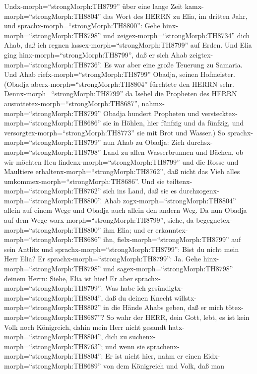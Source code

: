  Undx-morph=``strongMorph:TH8799'' über eine lange Zeit
kamx-morph=``strongMorph:TH8804'' das Wort des HERRN zu Elia, im dritten
Jahr, und sprachx-morph=``strongMorph:TH8800'': Gehe
hinx-morph=``strongMorph:TH8798'' und
zeigex-morph=``strongMorph:TH8734'' dich Ahab, daß ich regnen
lassex-morph=``strongMorph:TH8799'' auf Erden.  Und Elia
ging hinx-morph=``strongMorph:TH8799'', daß er sich Ahab
zeigtex-morph=``strongMorph:TH8736''. Es war aber eine große Teuerung zu
Samaria.  Und Ahab riefx-morph=``strongMorph:TH8799''
Obadja, seinen Hofmeister. (Obadja aberx-morph=``strongMorph:TH8804''
fürchtete den HERRN sehr. 
Dennx-morph=``strongMorph:TH8799'' da Isebel die Propheten des HERRN
ausrottetex-morph=``strongMorph:TH8687'',
nahmx-morph=``strongMorph:TH8799'' Obadja hundert Propheten und
verstecktex-morph=``strongMorph:TH8686'' sie in Höhlen, hier fünfzig und
da fünfzig, und versorgtex-morph=``strongMorph:TH8773'' sie mit Brot und
Wasser.)  So sprachx-morph=``strongMorph:TH8799'' nun Ahab
zu Obadja: Zieh durchsx-morph=``strongMorph:TH8798'' Land zu allen
Wasserbrunnen und Bächen, ob wir möchten Heu
findenx-morph=``strongMorph:TH8799'' und die Rosse und Maultiere
erhaltenx-morph=``strongMorph:TH8762'', daß nicht das Vieh alles
umkommex-morph=``strongMorph:TH8686''.  Und sie
teiltenx-morph=``strongMorph:TH8762'' sich ins Land, daß sie es
durchzogenx-morph=``strongMorph:TH8800''. Ahab
zogx-morph=``strongMorph:TH8804'' allein auf einem Wege und Obadja auch
allein den andern Weg.  Da nun Obadja auf dem Wege
warx-morph=``strongMorph:TH8799'', siehe, da
begegnetex-morph=``strongMorph:TH8800'' ihm Elia; und er
erkanntex-morph=``strongMorph:TH8686'' ihn,
fielx-morph=``strongMorph:TH8799'' auf sein Antlitz und
sprachx-morph=``strongMorph:TH8799'': Bist du nicht mein Herr Elia?
 Er sprachx-morph=``strongMorph:TH8799'': Ja. Gehe
hinx-morph=``strongMorph:TH8798'' und sagex-morph=``strongMorph:TH8798''
deinem Herrn: Siehe, Elia ist hier!  Er aber
sprachx-morph=``strongMorph:TH8799'': Was habe ich
gesündigtx-morph=``strongMorph:TH8804'', daß du deinen Knecht
willstx-morph=``strongMorph:TH8802'' in die Hände Ahabs geben, daß er
mich tötex-morph=``strongMorph:TH8687''?  So wahr der HERR,
dein Gott, lebt, es ist kein Volk noch Königreich, dahin mein Herr nicht
gesandt hatx-morph=``strongMorph:TH8804'', dich zu
suchenx-morph=``strongMorph:TH8763''; und wenn sie
sprachenx-morph=``strongMorph:TH8804'': Er ist nicht hier, nahm er einen
Eidx-morph=``strongMorph:TH8689'' von dem Königreich und Volk, daß man
